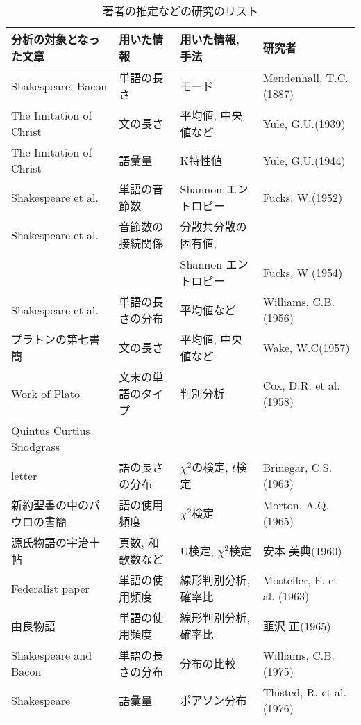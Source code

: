 \begin{table}[htb]
\caption{{\dg 著者の推定などの研究のリスト}\label{rri}}
\begin{center}
\renewcommand{\arraystretch}{}
\footnotesize{
\begin{tabular}{llll} \hline
 分析の対象となった文章      &用いた情報    &用いた情報, 手法   &研究者  \\ \hline
Shakespeare, Bacon    &単語の長さ    &モード               & Mendenhall, T.C.(1887) \\ 
The Imitation of Christ &文の長さ      &平均値, 中央値など   & Yule, G.U.(1939)       \\
The Imitation of Christ &語彙量        &K特性値     & Yule, G.U.(1944)       \\
Shakespeare et al.         &単語の音節数  &Shannon エントロピー      &Fucks, W.(1952)       \\
Shakespeare et al.         &音節数の接続関係& 分散共分散の固有値, &                  \\
                        &              &Shannon エントロピー& Fucks, W.(1954)        \\
Shakespeare et al.      &単語の長さの分布& 平均値など       & Williams, C.B.(1956)    \\
プラトンの第七書簡      &文の長さ      &平均値, 中央値など   & Wake, W.C(1957)      \\
Work of Plato           &文末の単語のタイプ&判別分析         &Cox, D.R. et al. (1958) \\
Quintus Curtius Snodgrass&              &                    &                       \\ 
letter                  &語の長さの分布 &$\chi ^2$の検定, $t$検定& Brinegar, C.S.(1963) \\
新約聖書の中のパウロの書簡 
                        &語の使用頻度  & $\chi ^2$検定          &Morton, A.Q.(1965)      \\
源氏物語の宇治十帖      &頁数, 和歌数など&U検定, $\chi ^2$検定  &安本 美典(1960)        \\
Federalist paper         &単語の使用頻度  &線形判別分析, 確率比  &Mosteller, F. et al. (1963) \\
由良物語                &単語の使用頻度  &線形判別分析, 確率比  &韮沢 正(1965)     \\
Shakespeare and Bacon   &単語の長さの分布  &分布の比較          &Williams, C.B.(1975) \\
Shakespeare             &語彙量          &ポアソン分布          &Thisted, R. et al. (1976)\\

\end{tabular}}
\end{center}
\end{table}
